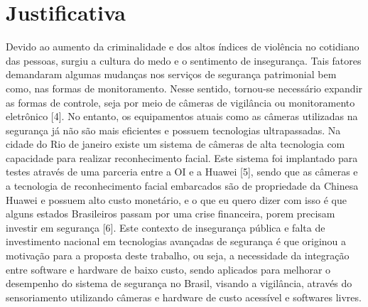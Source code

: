
\section{Justificativa} 
Devido ao aumento da criminalidade e dos altos índices de violência no cotidiano das pessoas, surgiu a cultura do medo e o sentimento de insegurança. Tais fatores demandaram algumas mudanças nos serviços de segurança patrimonial bem como, nas formas de monitoramento. Nesse sentido, tornou-se necessário expandir as formas de controle, seja por meio de câmeras de vigilância ou monitoramento eletrônico \cite{quatro}[4]. No entanto, os equipamentos atuais como as câmeras utilizadas na segurança já não são mais eficientes e possuem tecnologias ultrapassadas. 
Na cidade do Rio de janeiro existe um sistema de câmeras de alta tecnologia com capacidade para realizar reconhecimento facial. Este sistema foi implantado para testes através de uma parceria entre a OI e a Huawei \cite{cinco}[5], sendo que as câmeras e a tecnologia de reconhecimento facial embarcados são de propriedade da Chinesa Huawei e possuem alto custo monetário, e o que eu quero dizer com isso é que alguns estados Brasileiros passam por uma crise financeira, porem precisam investir em segurança \cite{seis}[6].
Este contexto de insegurança pública e falta de investimento nacional em tecnologias avançadas de segurança é que originou a motivação para a proposta deste trabalho, ou seja, a necessidade da integração entre software e hardware de baixo custo, sendo aplicados para melhorar o desempenho do sistema de segurança no Brasil, visando a vigilância, através do sensoriamento utilizando câmeras e hardware de custo acessível e softwares livres.



